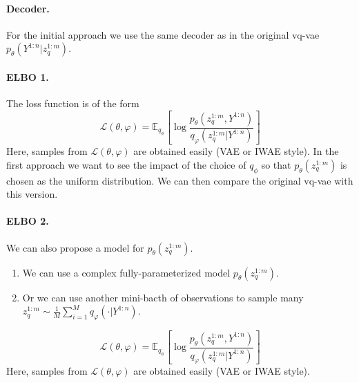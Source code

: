 \documentclass{article}
\begin{document}
\paragraph{Decoder.} For the initial approach we use the same decoder as in the original vq-vae $p_{\theta}(Y^{1:n}|z_q^{1:m})$.

\paragraph{ELBO 1.}
The loss function is of the form
$$
\mathcal{L}(\theta,\varphi) = \mathbb{E}_{q_\phi}\left[\log\frac{p_\theta(z_q^{1:m},Y^{1:n})}{q_\varphi(z_q^{1:m}|Y^{1:n})}\right]
$$
Here, samples from $\mathcal{L}(\theta,\varphi)$ are obtained easily (VAE or IWAE style). In the first approach we want to see the impact of the choice of $q_\phi$ so that $p_\theta(z_q^{1:m})$ is chosen as the uniform distribution.
We can then compare the original vq-vae with this version.

\paragraph{ELBO 2.}
We can also propose a model for $p_\theta(z_q^{1:m})$.
\begin{enumerate}
\item We can use a complex fully-parameterized model $p_\theta(z_q^{1:m})$.
\item Or we can use another mini-bacth of observations to sample many $z_q^{1:m}\sim \frac{1}{M}\sum_{i=1}^M q_\varphi(\cdot | Y^{1:n})$.
\end{enumerate}
$$
\mathcal{L}(\theta,\varphi) = \mathbb{E}_{q_\phi}\left[\log\frac{p_\theta(z_q^{1:m},Y^{1:n})}{q_\varphi(z_q^{1:m}|Y^{1:n})}\right]
$$
Here, samples from $\mathcal{L}(\theta,\varphi)$ are obtained easily (VAE or IWAE style).
\end{document}
